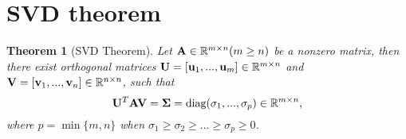 \documentclass[11pt]{article}
\def\A{{\bf A}}
\def\U{{\bf U}}
\def\u{{\bf u}}
\def\V{{\bf V}}
\def\v{{\bf v}}
\def\BR{{\mathbb R}}
\def\Si{\mbox{\boldmath$\Sigma$\unboldmath}}
\newtheorem{theorem}{Theorem}[section]
\begin{document}

\section{SVD theorem}
\begin{theorem}[SVD Theorem]
 Let $\A \in \BR^{m\times n}(m\geq n)$ be a nonzero matrix, then there exist orthogonal matrices $\U = [\u_1, ..., \u_m] \in \BR^{m\times n}$
 and $\V = [\v_1, ..., \v_n] \in \BR^{n \times n}$,
 such that \[\U^T \A \V = \Si = \text{diag}(\sigma_1, ..., \sigma_p) \in \BR^{m \times n}, \]
 where $p = \min\{m, n\}$ when $\sigma_1 \geq \sigma_2 \geq ... \geq \sigma_p \geq 0$.
\end{theorem}
\end{document}
